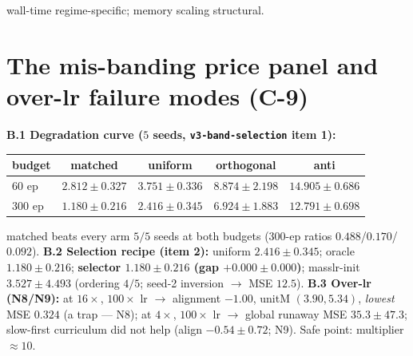 \documentclass[11pt]{article}
\begin{document}
wall-time regime-specific; memory scaling structural.

\section{The mis-banding price panel and over-lr failure modes (C-9)}
\textbf{B.1 Degradation curve ($5$ seeds, \texttt{v3-band-selection} item 1):}
\begin{center}\small
\begin{tabular}{lcccc}
\toprule
budget & matched & uniform & orthogonal & anti \\
\midrule
60 ep & $2.812\pm0.327$ & $3.751\pm0.336$ & $8.874\pm2.198$ & $14.905\pm0.686$ \\
300 ep & $\mathbf{1.180\pm0.216}$ & $2.416\pm0.345$ & $6.924\pm1.883$ & $12.791\pm0.698$ \\
\bottomrule
\end{tabular}
\end{center}
matched beats every arm $5/5$ seeds at both budgets ($300$-ep ratios $0.488$/$0.170$/$0.092$). \textbf{B.2 Selection recipe (item 2):} uniform $2.416\pm0.345$; oracle $1.180\pm0.216$; \textbf{selector $1.180\pm0.216$ (gap $+0.000\pm0.000$)}; masslr-init $3.527\pm4.493$ (ordering $4/5$; seed-2 inversion $\to$ MSE $12.5$). \textbf{B.3 Over-lr (N8/N9):} at $16\times$, $100\times$ lr $\to$ alignment $-1.00$, unitM $(3.90,5.34)$, \emph{lowest} MSE $0.324$ (a trap --- N8); at $4\times$, $100\times$ lr $\to$ global runaway MSE $35.3\pm47.3$; slow-first curriculum did not help (align $-0.54\pm0.72$; N9). Safe point: multiplier $\approx10$.
\end{document}
